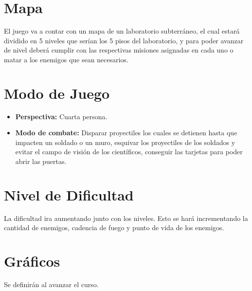 \documentclass{article}
\begin{document}
\section{Mapa}\label{mapa}
El juego va a contar con un mapa de un laboratorio subterráneo, el cual estará dividido en 5 niveles que serían los 5 pisos del laboratorio, y para poder avanzar de nivel deberá cumplir con las respectivas misiones asignadas en cada uno o matar a los enemigos que sean necesarios.

\section{Modo de Juego}\label{modo}
\begin{itemize}
    \item \textbf{Perspectiva:} Cuarta persona.
    \item \textbf{Modo de combate:} Disparar proyectiles los cuales se detienen hasta que impacten un soldado o un muro, esquivar los proyectiles de los soldados y evitar el campo de visión de los científicos, conseguir las tarjetas para poder abrir las puertas.
\end{itemize}

\section{Nivel de Dificultad}\label{dificultad}
La dificultad ira aumentando junto con los niveles. Esto se hará incrementando la cantidad de enemigos, cadencia de fuego y punto de vida de los enemigos.

\section{Gráficos}\label{gráficos}
Se definirán al avanzar el curso.



\end{document}
